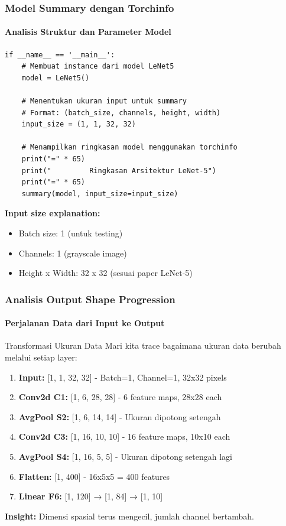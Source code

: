 \documentclass[t,aspectratio=169,xcolor=dvipsnames]{beamer}
\begin{document}
\begin{frame}[fragile]
    \frametitle{Model Summary dengan Torchinfo}
    \framesubtitle{Analisis Struktur dan Parameter Model}
    \scriptsize

\begin{verbatim}
if __name__ == '__main__':
    # Membuat instance dari model LeNet5
    model = LeNet5()
    
    # Menentukan ukuran input untuk summary
    # Format: (batch_size, channels, height, width)
    input_size = (1, 1, 32, 32) 
    
    # Menampilkan ringkasan model menggunakan torchinfo
    print("=" * 65)
    print("         Ringkasan Arsitektur LeNet-5")
    print("=" * 65)
    summary(model, input_size=input_size)
\end{verbatim}

    \textbf{Input size explanation:}
    \begin{itemize}
        \item Batch size: 1 (untuk testing)
        \item Channels: 1 (grayscale image)
        \item Height x Width: 32 x 32 (sesuai paper LeNet-5)
    \end{itemize}

\end{frame}


\begin{frame}
    \frametitle{Analisis Output Shape Progression}
    \framesubtitle{Perjalanan Data dari Input ke Output}
    \scriptsize

    \begin{block}{Transformasi Ukuran Data}
        Mari kita trace bagaimana ukuran data berubah melalui setiap layer:
    \end{block}

    \begin{enumerate}
        \item \textbf{Input:} [1, 1, 32, 32] - Batch=1, Channel=1, 32x32 pixels
        \item \textbf{Conv2d C1:} [1, 6, 28, 28] - 6 feature maps, 28x28 each
        \item \textbf{AvgPool S2:} [1, 6, 14, 14] - Ukuran dipotong setengah
        \item \textbf{Conv2d C3:} [1, 16, 10, 10] - 16 feature maps, 10x10 each
        \item \textbf{AvgPool S4:} [1, 16, 5, 5] - Ukuran dipotong setengah lagi
        \item \textbf{Flatten:} [1, 400] - 16x5x5 = 400 features
        \item \textbf{Linear F6:} [1, 120] → [1, 84] → [1, 10]
    \end{enumerate}

    \textbf{Insight:} Dimensi spasial terus mengecil, jumlah channel bertambah.

\end{frame}
\end{document}
